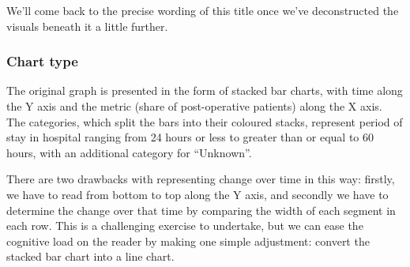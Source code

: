 \documentclass[
  letterpaper,
  DIV=11,
  numbers=noendperiod]{scrartcl}
\begin{document}
We'll come back to the precise wording of this title once we've
deconstructed the visuals beneath it a little further.

\hypertarget{chart-type}{%
\subsubsection{Chart type}\label{chart-type}}

The original graph is presented in the form of stacked bar charts, with
time along the Y axis and the metric (share of post-operative patients)
along the X axis. The categories, which split the bars into their
coloured stacks, represent period of stay in hospital ranging from 24
hours or less to greater than or equal to 60 hours, with an additional
category for ``Unknown''.

There are two drawbacks with representing change over time in this way:
firstly, we have to read from bottom to top along the Y axis, and
secondly we have to determine the change over that time by comparing the
width of each segment in each row. This is a challenging exercise to
undertake, but we can ease the cognitive load on the reader by making
one simple adjustment: convert the stacked bar chart into a line chart.
\end{document}
